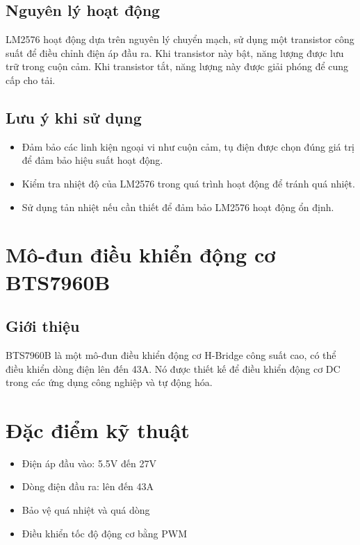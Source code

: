         \subsection{Nguyên lý hoạt động}
            LM2576 hoạt động dựa trên nguyên lý chuyển mạch, sử dụng một transistor công suất để điều chỉnh điện áp đầu ra. Khi transistor này bật, năng lượng được lưu trữ trong cuộn cảm. Khi transistor tắt, năng lượng này được giải phóng để cung cấp cho tải.
            
        \subsection{Lưu ý khi sử dụng}
            \begin{itemize}
                \item Đảm bảo các linh kiện ngoại vi như cuộn cảm, tụ điện được chọn đúng giá trị để đảm bảo hiệu suất hoạt động.
                \item Kiểm tra nhiệt độ của LM2576 trong quá trình hoạt động để tránh quá nhiệt.
                \item Sử dụng tản nhiệt nếu cần thiết để đảm bảo LM2576 hoạt động ổn định.
            \end{itemize}
    \section{Mô-đun điều khiển động cơ BTS7960B}     
        \subsection{Giới thiệu}
            BTS7960B là một mô-đun điều khiển động cơ H-Bridge công suất cao, có thể điều khiển dòng điện lên đến 43A. Nó được thiết kế để điều khiển động cơ DC trong các ứng dụng công nghiệp và tự động hóa.
            
            \section{Đặc điểm kỹ thuật}
            \begin{itemize}
                \item Điện áp đầu vào: 5.5V đến 27V
                \item Dòng điện đầu ra: lên đến 43A
                \item Bảo vệ quá nhiệt và quá dòng
                \item Điều khiển tốc độ động cơ bằng PWM
            \end{itemize}
            

